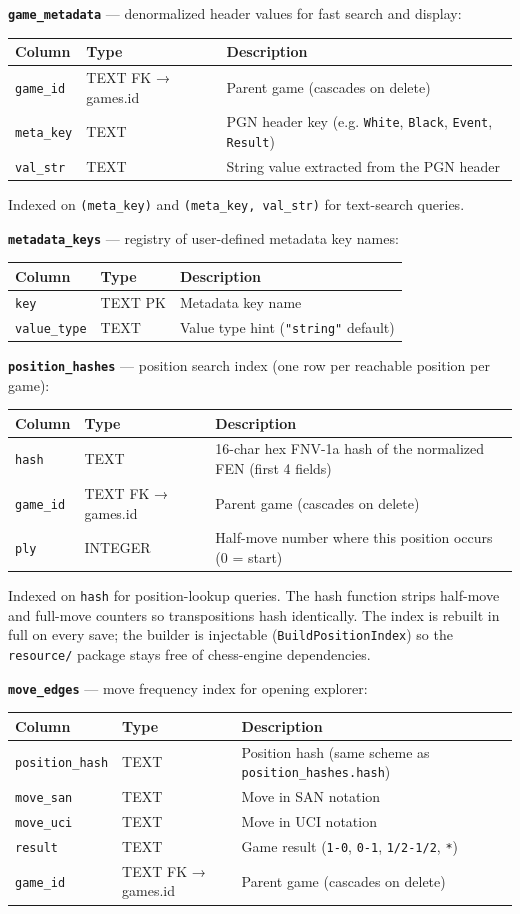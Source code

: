 \documentclass[]{article}
\begin{document}
\textbf{\texttt{game\_metadata}} --- denormalized header values for fast
search and display:

\begin{longtable}[]{@{}lll@{}}
\toprule
Column & Type & Description\tabularnewline
\midrule
\endhead
\texttt{game\_id} & TEXT FK → games.id & Parent game (cascades on
delete)\tabularnewline
\texttt{meta\_key} & TEXT & PGN header key (e.g. \texttt{White},
\texttt{Black}, \texttt{Event}, \texttt{Result})\tabularnewline
\texttt{val\_str} & TEXT & String value extracted from the PGN
header\tabularnewline
\bottomrule
\end{longtable}

Indexed on \texttt{(meta\_key)} and \texttt{(meta\_key,\ val\_str)} for
text-search queries.

\textbf{\texttt{metadata\_keys}} --- registry of user-defined metadata
key names:

\begin{longtable}[]{@{}lll@{}}
\toprule
Column & Type & Description\tabularnewline
\midrule
\endhead
\texttt{key} & TEXT PK & Metadata key name\tabularnewline
\texttt{value\_type} & TEXT & Value type hint (\texttt{"string"}
default)\tabularnewline
\bottomrule
\end{longtable}

\textbf{\texttt{position\_hashes}} --- position search index (one row
per reachable position per game):

\begin{longtable}[]{@{}lll@{}}
\toprule
Column & Type & Description\tabularnewline
\midrule
\endhead
\texttt{hash} & TEXT & 16-char hex FNV-1a hash of the normalized FEN
(first 4 fields)\tabularnewline
\texttt{game\_id} & TEXT FK → games.id & Parent game (cascades on
delete)\tabularnewline
\texttt{ply} & INTEGER & Half-move number where this position occurs (0
= start)\tabularnewline
\bottomrule
\end{longtable}

Indexed on \texttt{hash} for position-lookup queries. The hash function
strips half-move and full-move counters so transpositions hash
identically. The index is rebuilt in full on every save; the builder is
injectable (\texttt{BuildPositionIndex}) so the \texttt{resource/}
package stays free of chess-engine dependencies.

\textbf{\texttt{move\_edges}} --- move frequency index for opening
explorer:

\begin{longtable}[]{@{}lll@{}}
\toprule
Column & Type & Description\tabularnewline
\midrule
\endhead
\texttt{position\_hash} & TEXT & Position hash (same scheme as
\texttt{position\_hashes.hash})\tabularnewline
\texttt{move\_san} & TEXT & Move in SAN notation\tabularnewline
\texttt{move\_uci} & TEXT & Move in UCI notation\tabularnewline
\texttt{result} & TEXT & Game result (\texttt{1-0}, \texttt{0-1},
\texttt{1/2-1/2}, \texttt{*})\tabularnewline
\texttt{game\_id} & TEXT FK → games.id & Parent game (cascades on
delete)\tabularnewline
\bottomrule
\end{longtable}
\end{document}
